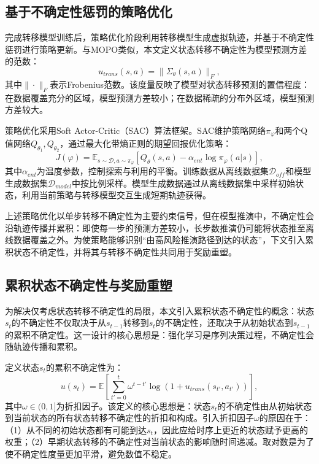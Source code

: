 \subsection{基于不确定性惩罚的策略优化}\label{Sec3.2.2}

完成转移模型训练后，策略优化阶段利用转移模型生成虚拟轨迹，并基于不确定性惩罚进行策略更新。与MOPO\cite{Yu2020MOPO}类似，本文定义状态转移不确定性为模型预测方差的范数：
\begin{equation}\label{Eq:Chap3_transition_uncertainty}
  u_{trans}(s, a) = \|\Sigma_\theta(s, a)\|_F,
\end{equation}
其中$\|\cdot\|_F$表示Frobenius范数。该度量反映了模型对状态转移预测的置信程度：在数据覆盖充分的区域，模型预测方差较小；在数据稀疏的分布外区域，模型预测方差较大。

策略优化采用Soft Actor-Critic（SAC）\cite{Haarnoja2018SAC}算法框架。SAC维护策略网络$\pi_\varphi$和两个Q值网络$Q_{\theta_1}, Q_{\theta_2}$，通过最大化带熵正则的期望回报优化策略：
\begin{equation}\label{Eq:Chap3_sac_objective}
  J(\varphi) = \mathbb{E}_{s \sim \mathcal{D}, a \sim \pi_\varphi}[Q_\theta(s, a) - \alpha_{ent} \log \pi_\varphi(a|s)],
\end{equation}
其中$\alpha_{ent}$为温度参数，控制探索与利用的平衡。训练数据从离线数据集$\mathcal{D}_{off}$和模型生成数据集$\mathcal{D}_{model}$中按比例采样。模型生成数据通过从离线数据集中采样初始状态，利用当前策略与转移模型交互生成短期轨迹获得。

上述策略优化以单步转移不确定性为主要约束信号，但在模型推演中，不确定性会沿轨迹传播并累积：即使每一步的预测方差较小，长步数推演仍可能将状态推至离线数据覆盖之外。为使策略能够识别“由高风险推演路径到达的状态”，下文引入累积状态不确定性，并将其与转移不确定性共同用于奖励重塑。

\subsection{累积状态不确定性与奖励重塑}\label{Sec3.2.3}


为解决仅考虑状态转移不确定性的局限，本文引入累积状态不确定性的概念：状态$s_t$的不确定性不仅取决于从$s_{t-1}$转移到$s_t$的不确定性，还取决于从初始状态到$s_{t-1}$的累积不确定性。这一设计的核心思想是：强化学习是序列决策过程，不确定性会随轨迹传播和累积。

定义状态$s_t$的累积不确定性为：
\begin{equation}\label{Eq:Chap3_cumulative_uncertainty}
  u(s_t) = \mathbb{E}\left[\sum_{t'=0}^{t} \omega^{t-t'} \log\left(1 + u_{trans}(s_{t'}, a_{t'})\right)\right],
\end{equation}
其中$\omega \in (0, 1]$为折扣因子。该定义的核心思想是：状态$s_t$的不确定性由从初始状态到当前状态的所有状态转移不确定性的折扣和构成。引入折扣因子$\omega$的原因在于：（1）从不同的初始状态都有可能到达$s_t$，因此应给时序上更近的状态赋予更高的权重；（2）早期状态转移的不确定性对当前状态的影响随时间递减。取对数是为了使不确定性度量更加平滑，避免数值不稳定。

